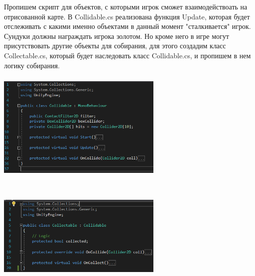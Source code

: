 \documentclass[a4paper,12pt]{article}
\begin{document}
Пропишем скрипт для объектов, с которыми игрок сможет взаимодействоать на отрисованной карте. В Collidable.cs реализована функция Update, которая будет отслеживать с какими именно объектами в данный момент "сталкивается" игрок. \\
Сундуки должны награждать игрока золотом. Но кроме него в игре могут присутствовать другие объекты для собирания, для этого создадим класс Collectable.cs, который будет наследовать класс Collidable.cs, и пропишем в нем логику собирания. \\
\centerline{\includegraphics[width = 300px, height=200px]{pictures/coll.png}}
\centerline{\includegraphics[width = 300px, height=200px]{pictures/coll1.png}}
\end{document}
